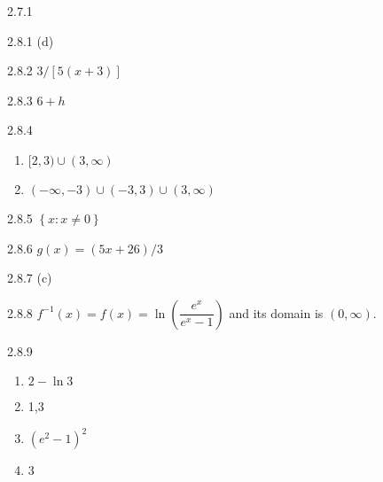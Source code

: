 \begin{Answer}{2.7.1}
	
\end{Answer}
\begin{Answer}{2.8.1}
	(d)
\end{Answer}
\begin{Answer}{2.8.2}
	$3/\left[5(x+3)\right]$
\end{Answer}
\begin{Answer}{2.8.3}
	$6+h$
\end{Answer}
\begin{Answer}{2.8.4}
\begin{enumerate}
	\item	$[2,3)\cup(3,\infty)$
	\item	$(-\infty,-3)\cup(-3,3)\cup(3,\infty)$
\end{enumerate}
\end{Answer}
\begin{Answer}{2.8.5}
	$\left\{x:x\neq 0\right\}$
\end{Answer}
\begin{Answer}{2.8.6}
	$g(x)=(5x+26)/3$
\end{Answer}
\begin{Answer}{2.8.7}
	(c)
\end{Answer}
\begin{Answer}{2.8.8}
	$f^{-1}(x)=f(x)=\ln\left(\dfrac{e^x}{e^x-1}\right)$ and its domain is $(0,\infty)$.
\end{Answer}
\begin{Answer}{2.8.9}
\begin{enumerate}
	\item	$2-\ln 3$
	\item	1,3
	\item	$(e^2-1)^2$
	\item	3
\end{enumerate}
\end{Answer}
